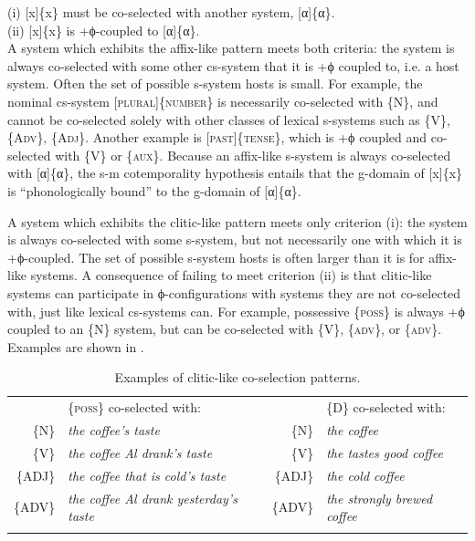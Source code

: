     (i)   [x]\{x\} must be co-selected with another system, [α]\{α\}.\\

    (ii)   [x]\{x\} is +ϕ-coupled to [α]\{α\}.\\

  A system which exhibits the affix-like pattern meets both criteria: the system is always co-selected with some other cs-system that it is +ϕ coupled to, i.e. a host system. Often the set of possible s-system hosts is small. For example, the nominal cs-system [\textsc{plural}]\{\textsc{number}\} is necessarily co-selected with \{N\}, and cannot be co-selected solely with other classes of lexical s-systems such as \{V\}, \{A\textsc{dv}\}, \{A\textsc{dj}\}. Another example is [\textsc{past}]\{\textsc{tense}\}, which is +ϕ coupled and co-selected with \{V\} or \{\textsc{aux}\}. Because an affix-like s-system is always co-selected with [α]\{α\}, the s-m cotemporality hypothesis entails that the g-domain of [x]\{x\} is “phonologically bound” to the g-domain of [α]\{α\}. 

  A system which exhibits the clitic-like pattern meets only criterion (i): the system is always co-selected with some s-system, but not necessarily one with which it is +ϕ-coupled. The set of possible s-system hosts is often larger than it is for affix-like systems. A consequence of failing to meet criterion (ii) is that clitic-like systems can participate in ϕ-configurations with systems they are not co-selected with, just like lexical cs-systems can. For example, possessive \{\textsc{poss}\} is always +ϕ coupled to an \{N\} system, but can be co-selected with \{V\}, \{\textsc{adv}\}, or \{\textsc{adv}\}. Examples are shown in {}.

\begin{table}
\begin{tabularx}{\textwidth}{rQrQ}
\lsptoprule                                                                                                                                                                      
 &\{\textsc{poss}\} co-selected with:  & & \{\textsc{D}\} co-selected with: \\
 \{N\}& \textit{the coffee’s taste} &  \{N\} &  \textit{the coffee} \\
 \{V\}& \textit{the coffee Al drank’s taste} &  \{V\} & \textit{the tastes good coffee}  \\
 \{A\textsc{DJ}\} & \textit{the coffee that is cold’s taste} & \{A\textsc{DJ}\} & \textit{the cold coffee} \\
 \{A\textsc{DV}\} &             \textit{the coffee Al drank yesterday’s taste} &        \{A\textsc{DV}\} &         \textit{the strongly brewed coffee}\\
\lspbottomrule
\end{tabularx}
\caption{Examples of clitic-like co-selection patterns.}\label{tab:4:1}
\end{table} 

